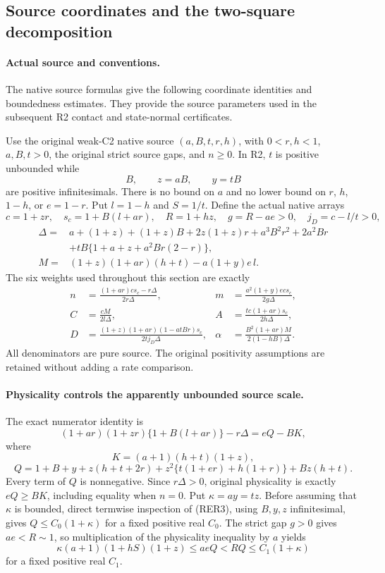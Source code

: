 \subsection{Source coordinates and the two-square decomposition}
\label{component:p667905169990}

\label{p667905169990:sec:r2-reconstructed-source-entry}

\paragraph{Actual source and conventions.}
The native source formulas give the following coordinate identities
and boundedness estimates. They provide the source parameters used
in the subsequent R2 contact and state-normal certificates.

Use the original weak-C2 native source $(a,B,t,r,h)$, with
$0<r,h<1$, $a,B,t>0$, the original strict source gaps, and $n\geq0$.
In R2, $t$ is positive unbounded while
\[
 B,\qquad z=aB,\qquad y=tB
\]
are positive infinitesimals.  There is no bound on $a$ and no lower
bound on $r$, $h$, $1-h$, or $e=1-r$.  Put $l=1-h$ and $S=1/t$.
Define the actual native arrays
\[
 c=1+zr,\quad s_c=1+B(l+ar),\quad
 R=1+hz,\quad g=R-ae>0,\quad j_D=c-l/t>0,
\]
\begin{align*}
 \Delta={}&a+(1+z)+(1+z)B+2z(1+z)r
          +a^3B^2r^2+2a^2Br\\
          &+tB\{1+a+z+a^2Br(2-r)\},\\
 M={}&(1+z)(1+ar)(h+t)-a(1+y)e\,l.
\end{align*}
The six weights used throughout this section are exactly
\[
\begin{aligned}
 n&=\frac{(1+ar)c s_c-r\Delta}{2r\Delta},&
 m&=\frac{a^2(1+y)e c s_c}{2g\Delta},\\
 C&=\frac{cM}{2l\Delta},&
 A&=\frac{tc(1+ar)s_c}{2h\Delta},\\
 D&=\frac{(1+z)(1+ar)(1-atBr)s_c}{2t j_D\Delta},&
 \alpha&=\frac{B^2(1+ar)M}{2(1-hB)\Delta}.
\end{aligned}                                                     \tag{RER1}
\]
All denominators are pure source.  The original positivity assumptions
are retained without adding a rate comparison.

\paragraph{Physicality controls the apparently unbounded source scale.}
The exact numerator identity is
\[
 (1+ar)(1+zr)\{1+B(l+ar)\}-r\Delta=eQ-BK,                \tag{RER2}
\]
where
\[
 K=(a+1)(h+t)(1+z),
\]
\[
 Q=1+B+y+z(h+t+2r)
       +z^2\{t(1+er)+h(1+r)\}+Bz(h+t).                 \tag{RER3}
\]
Every term of $Q$ is nonnegative.  Since $r\Delta>0$, original
physicality is exactly $eQ\geq BK$, including equality when $n=0$.
Put $\kappa=ay=tz$.  Before assuming that $\kappa$ is bounded, direct
termwise inspection of (RER3), using $B,y,z$ infinitesimal, gives
$Q\leq C_0(1+\kappa)$ for a fixed positive real $C_0$.
The strict gap $g>0$ gives $ae<R\sim1$, so multiplication of the
physicality inequality by $a$ yields
\[
 \kappa(a+1)(1+hS)(1+z)\leq aeQ<RQ
                                      \leq C_1(1+\kappa)           \tag{RER4}
\]
for a fixed positive real $C_1$.


